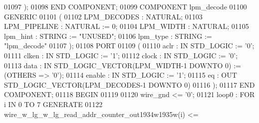 \begin{DoxyCode}
{01097      ); 
01098      \textcolor{keywordflow}{END} \textcolor{keywordflow}{COMPONENT};
01099      \textcolor{keywordflow}{COMPONENT}  lpm\_decode
01100      \textcolor{keywordflow}{GENERIC} 
01101      (
01102         LPM\_DECODES :   \textcolor{comment}{NATURAL};
01103         LPM\_PIPELINE    :   \textcolor{comment}{NATURAL} := \textcolor{vhdllogic}{}\textcolor{vhdllogic}{0};
01104         LPM\_WIDTH   :   \textcolor{comment}{NATURAL};
01105         lpm\_hint    :   \textcolor{comment}{STRING} := \textcolor{keyword}{"UNUSED"};
01106         lpm\_type    :   \textcolor{comment}{STRING} := \textcolor{keyword}{"lpm\_decode"}
01107      );
01108      \textcolor{keywordflow}{PORT}
01109      ( 
01110         aclr    :   \textcolor{keywordflow}{IN} \textcolor{comment}{STD\_LOGIC} := '\textcolor{vhdllogic}{}\textcolor{vhdllogic}{0}';
01111         clken   :   \textcolor{keywordflow}{IN} \textcolor{comment}{STD\_LOGIC} := '\textcolor{vhdllogic}{}\textcolor{vhdllogic}{1}';
01112         clock   :   \textcolor{keywordflow}{IN} \textcolor{comment}{STD\_LOGIC} := '\textcolor{vhdllogic}{}\textcolor{vhdllogic}{0}';
01113         data    :   \textcolor{keywordflow}{IN} \textcolor{comment}{STD\_LOGIC\_VECTOR}(LPM\_WIDTH\textcolor{vhdlchar}{-}\textcolor{vhdllogic}{}\textcolor{vhdllogic}{1} \textcolor{keywordflow}{DOWNTO} \textcolor{vhdllogic}{}\textcolor{vhdllogic}{0}) := (\textcolor{keywordflow}{OTHERS} => '\textcolor{vhdllogic}{}\textcolor{vhdllogic}{0}');
01114         enable  :   \textcolor{keywordflow}{IN} \textcolor{comment}{STD\_LOGIC} := '\textcolor{vhdllogic}{}\textcolor{vhdllogic}{1}';
01115         eq  :   \textcolor{keywordflow}{OUT} \textcolor{comment}{STD\_LOGIC\_VECTOR}(LPM\_DECODES\textcolor{vhdlchar}{-}\textcolor{vhdllogic}{}\textcolor{vhdllogic}{1} \textcolor{keywordflow}{DOWNTO} \textcolor{vhdllogic}{}\textcolor{vhdllogic}{0})
01116      ); 
01117      \textcolor{keywordflow}{END} \textcolor{keywordflow}{COMPONENT};
01118 \textcolor{vhdlkeyword}{ BEGIN}
01119 
01120     \textcolor{vhdlchar}{wire_gnd} \textcolor{vhdlchar}{<=} \textcolor{vhdlchar}{'}\textcolor{vhdllogic}{}\textcolor{vhdllogic}{0}\textcolor{vhdlchar}{'};
01121     \textcolor{vhdlchar}{loop0} \textcolor{vhdlchar}{:} \textcolor{keywordflow}{FOR} \textcolor{vhdlchar}{i} \textcolor{keywordflow}{IN} \textcolor{vhdllogic}{}\textcolor{vhdllogic}{0} \textcolor{keywordflow}{TO} \textcolor{vhdllogic}{}\textcolor{vhdllogic}{7} \textcolor{keywordflow}{GENERATE} 
01122         \textcolor{vhdlchar}{wire_w_lg_w_lg_read_addr_counter_out1934w1935w}\textcolor{vhdlchar}{(}\textcolor{vhdlchar}{i}\textcolor{vhdlchar}{)} \textcolor{vhdlchar}{<=} \textcolor{vhdlchar}{
}}
\end{DoxyCode}
